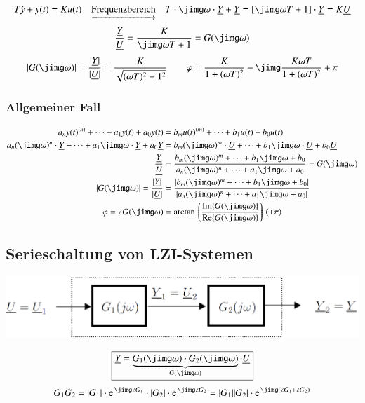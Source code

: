
\vspace{-0.3cm} %
$$ T \dot{y} + y(t) = K u(t) \quad \underrightarrow{\text{Frequenzbereich}} \quad 
T \cdot \jimg \omega \cdot \underline{Y} + \underline{Y} = [\jimg \omega T + 1] \cdot \underline{Y} = K \underline{U} $$
$$ \frac{\underline{Y}}{\underline{U}} = \frac{K}{\jimg \omega T + 1} = G(\jimg \omega) $$
$$ |G(\jimg \omega)| = \frac{|\underline{Y}|}{|\underline{U}|} = \frac{K}{\sqrt{(\omega T)^2 + 1^2}} \qquad \varphi = \frac{K}{1 + (\omega T)^2} - \jimg \frac{K \omega T}{1 + (\omega T)^2 } + \pi $$


\subsubsection{Allgemeiner Fall}


\vspace{-0.5cm} %
\begin{align*}
    a_n y(t)^{(n)} + \cdots  + a_1 \dot{y}(t) + a_0 y(t) &= b_m u(t)^{(m)} + \cdots + b_1 \dot{u}(t) + b_0 u(t) \\
    a_n (\jimg \omega)^n \cdot \underline{Y} + \cdots + a_1 \jimg \omega \cdot \underline{Y} + a_0 \underline{Y} 
    &=  b_m (\jimg \omega)^m \cdot \underline{U} + \cdots + b_1 \jimg \omega \cdot \underline{U} + b_0 \underline{U} \\
    \frac{\underline{Y}}{\underline{U}} 
    &= \frac{b_m (\jimg \omega)^m + \cdots + b_1 \jimg \omega + b_0}{a_n (\jimg \omega)^n + \cdots + a_1 \jimg \omega + a_0} = G(\jimg \omega) \\
    |G(\jimg \omega)| = \frac{|\underline{Y}|}{|\underline{U}|}
    &= \frac{| b_m (\jimg \omega)^m + \cdots + b_1 \jimg \omega + b_0 |}{| a_n (\jimg \omega)^n + \cdots + a_1 \jimg \omega + a_0 |} \\
    \varphi = \angle G(\jimg \omega) &= \arctan \left\lgroup \frac{\mathrm{Im} \{G(\jimg \omega)\}}{\mathrm{Re}\{G(\jimg \omega)\}} \right\rgroup (+ \pi)
\end{align*}




\subsection{Serieschaltung von LZI-Systemen}

\begin{center}
    \includegraphics[width=0.7\columnwidth]{images/frequenzgang_serieschaltung.png}
\end{center}
$$ \boxed{ \underline{Y} = \underbrace{G_1(\jimg \omega) \cdot G_2(\jimg \omega)}_{G(\jimg \omega)} \cdot \underline{U} } $$
$$ G_1 \dot G_2 = |G_1| \cdot \e^{\jimg \angle G_1} \cdot |G_2| \cdot \e^{\jimg \angle G_2} = |G_1| |G_2| \cdot \e^{\jimg (\angle G_1 + \angle G_2)} $$


